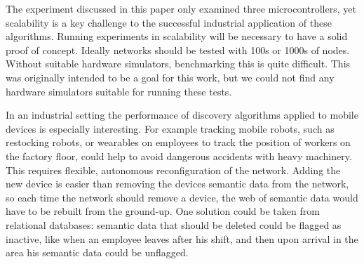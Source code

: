 The experiment discussed in this paper only examined three microcontrollers, yet scalability is a key challenge to the successful industrial application of these algorithms. Running experiments in scalability will be necessary to have a solid proof of concept. Ideally networks should be tested with 100s or 1000s of nodes. Without suitable hardware simulators, benchmarking this is quite difficult. This was originally intended to be a goal for this work, but we could not find any hardware simulators suitable for running these tests.

In an industrial setting the performance of discovery algorithms applied to mobile devices is especially interesting. For example tracking mobile robots, such as restocking robots, or wearables on employees to track the position of workers on the factory floor, could help to avoid dangerous accidents with heavy machinery. This requires flexible, autonomous reconfiguration of the network. Adding the new device is easier than removing the devices semantic data from the network, so each time the network should remove a device, the web of semantic data would have to be rebuilt from the ground-up. One solution could be taken from relational databases: semantic data that should be deleted could be flagged as inactive, like when an employee leaves after his shift, and then upon arrival in the area his semantic data could be unflagged.